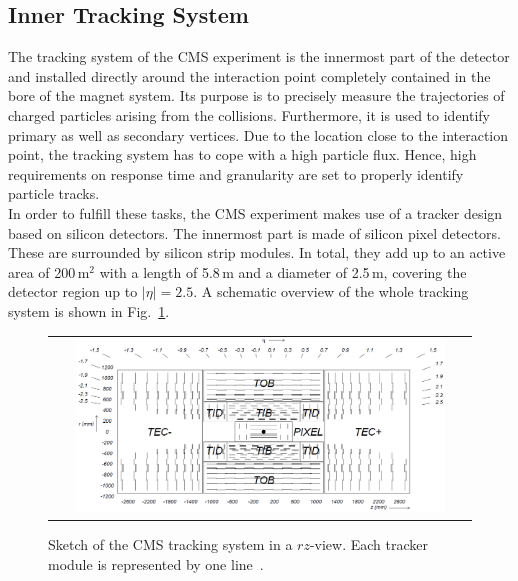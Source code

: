 \subsection{Inner Tracking System}
\label{subsec:cms_tracker}
The tracking system of the CMS experiment is the innermost part of the detector and installed directly around the interaction point completely contained in the bore of the magnet system. Its purpose is to precisely measure the trajectories of charged particles arising from the collisions. Furthermore, it is used to identify primary as well as secondary vertices. Due to the location close to the interaction point, the tracking system has to cope with a high particle flux. Hence, high requirements on response time and granularity are set to properly identify particle tracks. \\
In order to fulfill these tasks, the CMS experiment makes use of a tracker design based on silicon detectors. The innermost part is made of silicon pixel detectors. These are surrounded by silicon strip modules. In total, they add up to an active area of 200\,$\mathrm{m}^2$ with a length of 5.8\,m and a diameter of 2.5\,m, covering the detector region up to $|\eta| = 2.5$. A schematic overview of the whole tracking system is shown in Fig.~\ref{fig:CMS_tracker}. 
\begin{figure}[!tp]
  \centering
  \begin{tabular}{c}
    \includegraphics[width=0.9\textwidth]{figures/Figures_Experimental_Apparatus_Tracker.png}
  \end{tabular}
  \caption{Sketch of the CMS tracking system in a $rz$-view. Each tracker module is represented by one line~\cite{Chatrchyan:2008zzk}.}
  \label{fig:CMS_tracker}
\end{figure} 
